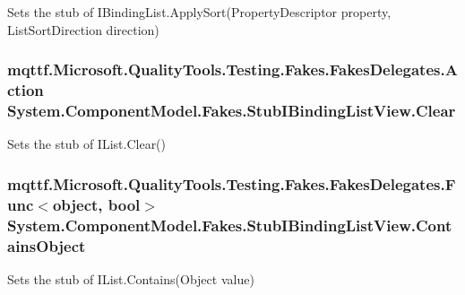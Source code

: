 Sets the stub of I\-Binding\-List.\-Apply\-Sort(\-Property\-Descriptor property, List\-Sort\-Direction direction)

\hypertarget{class_system_1_1_component_model_1_1_fakes_1_1_stub_i_binding_list_view_a441bb95553a16f744e9788b20a35fccd}{
\subsubsection[{Clear}]{\setlength{\rightskip}{0pt plus 5cm}mqttf.\-Microsoft.\-Quality\-Tools.\-Testing.\-Fakes.\-Fakes\-Delegates.\-Action System.\-Component\-Model.\-Fakes.\-Stub\-I\-Binding\-List\-View.\-Clear}}\label{class_system_1_1_component_model_1_1_fakes_1_1_stub_i_binding_list_view_a441bb95553a16f744e9788b20a35fccd}


Sets the stub of I\-List.\-Clear()

\hypertarget{class_system_1_1_component_model_1_1_fakes_1_1_stub_i_binding_list_view_a7c724e9039cfb5111487f539c2a498f1}{
\subsubsection[{Contains\-Object}]{\setlength{\rightskip}{0pt plus 5cm}mqttf.\-Microsoft.\-Quality\-Tools.\-Testing.\-Fakes.\-Fakes\-Delegates.\-Func$<$object, bool$>$ System.\-Component\-Model.\-Fakes.\-Stub\-I\-Binding\-List\-View.\-Contains\-Object}}\label{class_system_1_1_component_model_1_1_fakes_1_1_stub_i_binding_list_view_a7c724e9039cfb5111487f539c2a498f1}


Sets the stub of I\-List.\-Contains(\-Object value)

